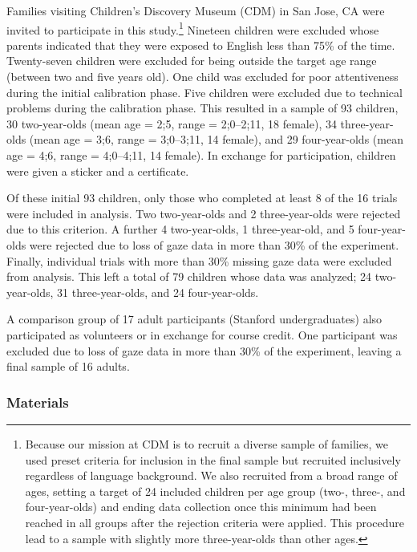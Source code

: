 \documentclass[man]{apa2}
\begin{document}
Families visiting Children's Discovery Museum (CDM) in San Jose, CA were invited to participate in this study.\footnote{Because our mission at CDM is to recruit a diverse sample of families, we used preset criteria for inclusion in the final sample but recruited inclusively regardless of language background.  We also recruited from a broad range of ages, setting a target of 24 included children per age group (two-, three-, and four-year-olds) and ending data collection once this minimum had been reached in all groups after the rejection criteria were applied.  This procedure lead to a sample with slightly more three-year-olds than other ages.}  Nineteen children were excluded whose parents indicated that they were exposed to English less than 75\% of the time.  Twenty-seven children were excluded for being outside the target age range (between two and five years old).  One child was excluded for poor attentiveness during the initial calibration phase.  Five children were excluded due to technical problems during the calibration phase.  This resulted in a sample of 93 children, 30 two-year-olds (mean age = 2;5, range = 2;0--2;11, 18 female), 34 three-year-olds (mean age = 3;6, range = 3;0--3;11, 14 female), and 29 four-year-olds (mean age = 4;6, range = 4;0--4;11, 14 female).  In exchange for participation, children were given a sticker and a certificate.  

Of these initial 93 children, only those who completed at least 8 of the 16 trials were included in analysis.  Two two-year-olds and 2 three-year-olds were rejected due to this criterion.  A further 4 two-year-olds, 1 three-year-old, and 5 four-year-olds were rejected due to loss of gaze data in more than 30\% of the experiment.  Finally, individual trials with more than 30\% missing gaze data were excluded from analysis.   This left a total of 79 children whose data was analyzed; 24 two-year-olds, 31 three-year-olds, and 24 four-year-olds. 

A comparison group of 17 adult participants (Stanford undergraduates) also participated as volunteers or in exchange for course credit.  One participant was excluded due to loss of gaze data in more than 30\% of the experiment, leaving a final sample of 16 adults.  

\subsubsection{Materials}
\end{document}
